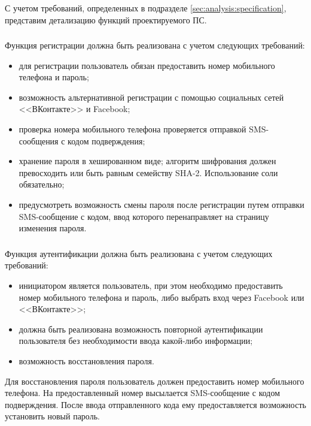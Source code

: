 С учетом требований, определенных в подразделе \ref{sec:analysis:specification}, представим детализацию функций проектируемого ПС.

\subsubsection{}
\label{sec:domain:specification:signup}

Функция регистрации должна быть реализована с учетом следующих требований:
\begin{itemize}
	\item для регистрации пользователь обязан предоставить номер мобильного телефона и пароль;
	\item возможность альтернативной регистрации с помощью социальных сетей <<ВКонтакте>> и Facebook;
	\item проверка номера мобильного телефона проверяется отправкой SMS-сообщения с кодом подверждения;
	\item хранение пароля в хешированном виде; алгоритм шифрования должен превосходить или быть равным семейству SHA-2. Использование соли обязательно;
	\item предусмотреть возможность смены пароля после регистрации путем отправки SMS-сообщение с кодом, ввод которого перенаправляет на страницу изменения пароля.
\end{itemize}

\subsubsection{}
\label{sec:domain:specification:authentication}

Функция аутентификации должна быть реализована с учетом следующих требований:
\begin{itemize}
	\item инициатором является пользователь, при этом необходимо предоставить номер мобильного телефона и пароль, либо выбрать вход через Facebook или <<ВКонтакте>>;
	\item должна быть реализована возможность повторной аутентификации пользователя без необходимости ввода какой-либо информации;
	\item возможность восстановления пароля.
\end{itemize}

Для восстановления пароля пользователь должен предоставить номер мобильного телефона. На предоставленный номер высылается SMS-сообщение с кодом подверждения. После ввода отправленного кода ему предоставляется возможность установить новый пароль.

